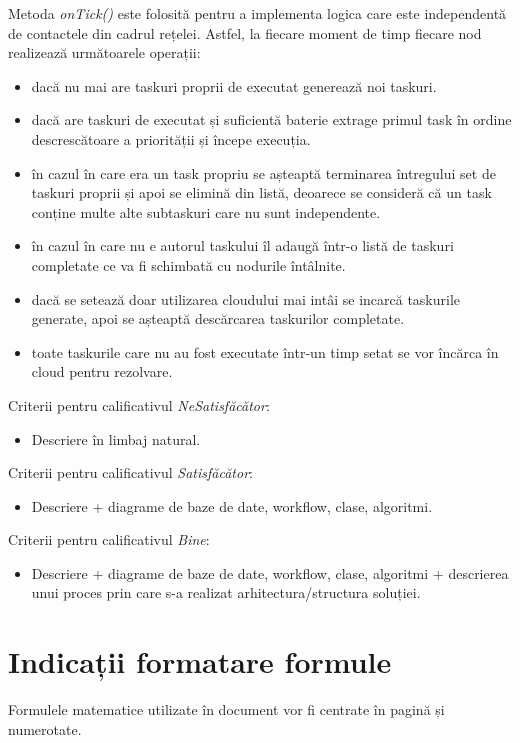 \documentclass[12pt,a4paper]{report}
\begin{document}
Metoda \textit{onTick()} este folosită pentru a implementa logica care este independentă de contactele din cadrul rețelei. Astfel, la fiecare moment de timp fiecare nod realizează următoarele operații:
\begin{itemize}
	\item dacă nu mai are taskuri proprii de executat generează noi taskuri.
	\item dacă are taskuri de executat și suficientă baterie extrage primul task în ordine descrescătoare a priorității și începe execuția.
	\item în cazul în care era un task propriu se așteaptă terminarea întregului set de taskuri proprii și apoi se elimină din listă, deoarece se consideră că un task conține multe alte subtaskuri care nu sunt independente.
	\item în cazul în care nu e autorul taskului îl adaugă într-o listă de taskuri completate ce va fi schimbată cu nodurile întâlnite.
	\item dacă se setează doar utilizarea cloudului mai intâi se incarcă taskurile generate, apoi se așteaptă descărcarea taskurilor completate.
	\item toate taskurile care nu au fost executate într-un timp setat se vor încărca în cloud pentru rezolvare.
\end{itemize}


Criterii pentru calificativul \textit{Ne\textit{Satisfăcător}}: 
\begin{itemize}
	\item	Descriere în limbaj natural.
\end{itemize}

Criterii pentru calificativul \textit{Satisfăcător}: 
\begin{itemize}
	\item	Descriere + diagrame de baze de date, workflow, clase, algoritmi. 
\end{itemize}

Criterii pentru calificativul \textit{Bine}: 
\begin{itemize}
	\item 	Descriere + diagrame de baze de date, workflow, clase, algoritmi + descrierea unui proces prin care s-a realizat arhitectura/structura soluției.
\end{itemize}

\section{Indicații formatare formule}
Formulele matematice utilizate în document vor fi centrate în pagină și numerotate. 
\end{document}
